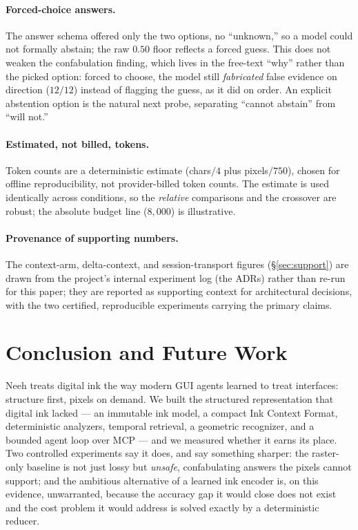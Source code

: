 \documentclass[11pt]{article}
\begin{document}
\paragraph{Forced-choice answers.} The answer schema offered only the two options,
no ``unknown,'' so a model could not formally abstain; the raw $0.50$ floor
reflects a forced guess. This does not weaken the confabulation finding, which
lives in the free-text ``why'' rather than the picked option: forced to choose,
the model still \emph{fabricated} false evidence on direction ($12/12$) instead of
flagging the guess, as it did on order. An explicit abstention option is the
natural next probe, separating ``cannot abstain'' from ``will not.''

\paragraph{Estimated, not billed, tokens.} Token counts are a deterministic
estimate (chars$/4$ plus pixels$/750$), chosen for offline reproducibility, not
provider-billed token counts. The estimate is used identically across conditions,
so the \emph{relative} comparisons and the crossover are robust; the absolute
budget line ($8{,}000$) is illustrative.

\paragraph{Provenance of supporting numbers.} The context-arm, delta-context, and
session-transport figures (\S\ref{sec:support}) are drawn from the project's
internal experiment log (the ADRs) rather than re-run for this paper; they are
reported as supporting context for architectural decisions, with the two
certified, reproducible experiments carrying the primary claims.

\section{Conclusion and Future Work}

Neeh treats digital ink the way modern GUI agents learned to treat interfaces:
structure first, pixels on demand. We built the structured representation that
digital ink lacked --- an immutable ink model, a compact Ink Context Format,
deterministic analyzers, temporal retrieval, a geometric recognizer, and a
bounded agent loop over MCP --- and we measured whether it earns its place. Two
controlled experiments say it does, and say something sharper: the raster-only
baseline is not just lossy but \emph{unsafe}, confabulating answers the pixels
cannot support; and the ambitious alternative of a learned ink encoder is, on
this evidence, unwarranted, because the accuracy gap it would close does not
exist and the cost problem it would address is solved exactly by a deterministic
reducer.
\end{document}
